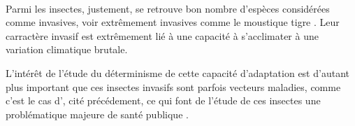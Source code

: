 \paragraph{} %
\label{par:intro1}

Parmi les insectes, justement, se retrouve bon nombre d'espèces considérées
comme invasives, voir extrêmement invasives comme le moustique tigre
. Leur carractère invasif est extrêmement lié à une
capacité à s'acclimater à une variation climatique brutale.


L'intérêt de l'étude du déterminisme de cette capacité d'adaptation est
d'autant plus important que ces insectes invasifs sont parfois vecteurs
maladies, comme c'est le cas d', cité précédement, ce
qui font de l'étude de ces insectes une problématique majeure de santé
publique \cite{schaffner2013}.



\paragraph{} %
\label{par:intro3}


